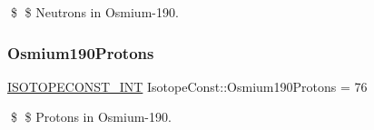 \$ \$ Neutrons in Osmium-\/190. \mbox{\label{group___isotope_const-_osmium-_os190_ga1612cab63b7857fdf68f95f7c2741cf2}} 
\subsubsection{\texorpdfstring{Osmium190\+Protons}{Osmium190Protons}}
{\footnotesize\ttfamily \mbox{\hyperlink{group___isotope_const-_macros_ga5f18360b3e99483a35c32d789e62621c}{I\+S\+O\+T\+O\+P\+E\+C\+O\+N\+S\+T\+\_\+\+I\+NT}} Isotope\+Const\+::\+Osmium190\+Protons = 76}

\$ \$ Protons in Osmium-\/190. 